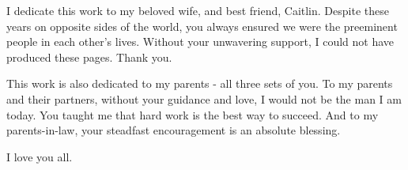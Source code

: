 
\begin{dedication} 

I dedicate this work to my beloved wife, and best friend, Caitlin. Despite these years on opposite sides of the world, you always ensured we were the preeminent people in each other's lives. Without your unwavering support, I could not have produced these pages. Thank you.

This work is also dedicated to my parents - all three sets of you. To my parents and their partners, without your guidance and love, I would not be the man I am today. You taught me that hard work is the best way to succeed. And to my parents-in-law, your steadfast encouragement is an absolute blessing.

I love you all.

\end{dedication}